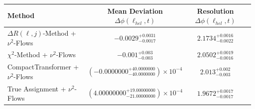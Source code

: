     \begin{tabular}{lccc}
        \toprule
        Method & Mean Deviation $\Delta\phi(\ell_{hel}, t)$ & Resolution $\Delta\phi(\ell_{hel}, t)$ \\
        \midrule
        $\Delta R(\ell,j)$-Method + $\nu^2$-Flows & $-0.0029^{+0.0031}_{-0.0017}$ & $2.1734^{+0.0016}_{-0.0022}$ \\
        $\chi^2$-Method + $\nu^2$-Flows & $-0.001^{+0.003}_{-0.003}$ & $2.0502^{+0.0019}_{-0.0016}$ \\
        CompactTransformer + $\nu^2$-Flows & $(-0.0000000^{+40.0000000}_{-40.0000000})\times 10^{-4}$ & $2.013^{+0.002}_{-0.003}$ \\
        True Assignment + $\nu^2$-Flows & $(4.00000000^{+19.00000000}_{-21.00000000})\times 10^{-4}$ & $1.9672^{+0.0017}_{-0.0017}$ \\
        \bottomrule
    \end{tabular}